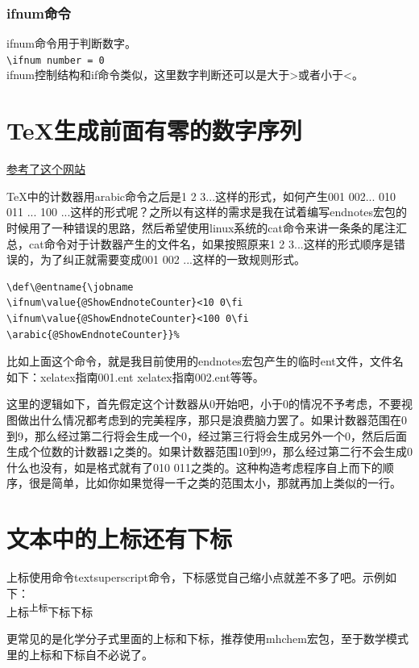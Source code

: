 \documentclass[12pt,oneside]{book}
\begin{document}
\begin{common-format}
\subsubsection{ifnum命令}
ifnum命令用于判断数字。\\
\verb+\ifnum number = 0+\\
ifnum控制结构和if命令类似，这里数字判断还可以是大于>或者小于<。

\section{TeX生成前面有零的数字序列}
\href{http://tex.stackexchange.com/questions/30930/how-to-output-a-counter-with-leading-zeros}{参考了这个网站}

TeX中的计数器用arabic命令之后是1 2 3...这样的形式，如何产生001 002... 010 011 ... 100 ...这样的形式呢？之所以有这样的需求是我在试着编写endnotes宏包的时候用了一种错误的思路，然后希望使用linux系统的cat命令来讲一条条的尾注汇总，cat命令对于计数器产生的文件名，如果按照原来1 2 3...这样的形式顺序是错误的，为了纠正就需要变成001  002 ...这样的一致规则形式。

\begin{Verbatim}
\def\@entname{\jobname
\ifnum\value{@ShowEndnoteCounter}<10 0\fi
\ifnum\value{@ShowEndnoteCounter}<100 0\fi
\arabic{@ShowEndnoteCounter}}%
\end{Verbatim}

比如上面这个命令，就是我目前使用的endnotes宏包产生的临时ent文件，文件名如下：xelatex指南001.ent xelatex指南002.ent等等。

这里的逻辑如下，首先假定这个计数器从0开始吧，小于0的情况不予考虑，不要视图做出什么情况都考虑到的完美程序，那只是浪费脑力罢了。如果计数器范围在0到9，那么经过第二行将会生成一个0，经过第三行将会生成另外一个0，然后后面生成个位数的计数器1之类的。如果计数器范围10到99，那么经过第二行不会生成0什么也没有，如是格式就有了010 011之类的。这种构造考虑程序自上而下的顺序，很是简单，比如你如果觉得一千之类的范围太小，那就再加上类似的一行。



\section{文本中的上标还有下标}
上标使用命令textsuperscript命令，下标感觉自己缩小点就差不多了吧。示例如下：\\
上标\textsuperscript{上标}下标{\scriptsize 下标}

更常见的是化学分子式里面的上标和下标，推荐使用mhchem宏包，至于数学模式里的上标和下标自不必说了。



\end{common-format}
\end{document}
